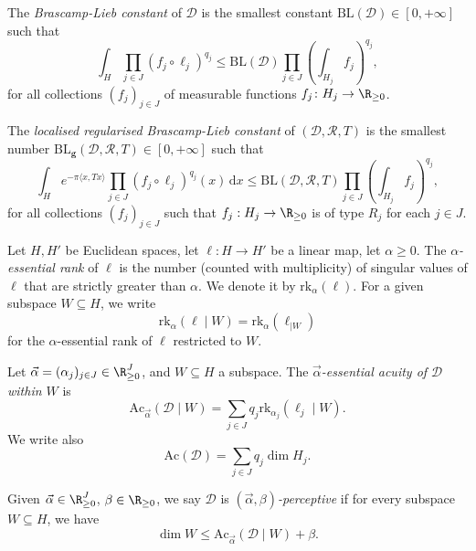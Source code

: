 The \emph{Brascamp-Lieb constant} of $\mathcal{D}$ is the smallest constant $\mathrm{BL}(\mathcal{D})\in [0, +\infty]$ such that
\begin{equation*}%
\int_{H} \prod_{j \in J} (f_{j}\circ \ell_{j})^{q_{j}} \leq \mathrm{BL}(\mathcal{D}) \prod_{j \in J} \left(\int_{H_{j}} f_{j} \right)^{q_{j}},
\end{equation*}
for all collections $(f_{j})_{j \in J}$ of measurable functions $f_j  \colon H_{j} \rightarrow \R_{\geq 0}$.

The \emph{localised regularised Brascamp-Lieb constant} of $(\mathcal{D}, \mathcal{R}, T)$ is the smallest number $\mathrm{BL}_{\mathbf{g}}(\mathcal{D}, \mathcal{R}, T)\in [0,+\infty]$ such that
\[
\int_{H} e^{-\pi \langle x, T x \rangle} \prod_{j \in J} (f_{j}\circ \ell_{j})^{q_{j}}(x) \,\mathrm{d} x \leq \mathrm{BL}(\mathcal{D}, \mathcal{R}, T) \prod_{j \in J} \left(\int_{H_{j}} f_{j} \right)^{q_{j}},
\]
for all collections $(f_{j})_{j \in J}$ such that $f_j :  H_{j}\rightarrow \R_{\geq 0}$ is of type $R_j$ for each $j \in J$.


\begin{definition}\label{def-ess-rank}
Let $H,H'$ be Euclidean spaces, let $\ell:H\rightarrow H'$ be a linear map, let $\alpha \geq 0$.
The  \emph{$\alpha$-essential rank} of $\ell$ is the number (counted with multiplicity) of  singular values of $\ell$ that are strictly greater than $\alpha$. We denote it by $\mathrm{rk}_\alpha(\ell)$.
For a given subspace $W \subseteq H$, we write
\[
\mathrm{rk}_\alpha(\ell \mid W) = \mathrm{rk}_\alpha( \ell_{\mid W})
\]
for the $\alpha$-essential rank of $\ell$ restricted to $W$.
\end{definition}

\begin{definition} \label{def-acuity}
Let $\vec{\alpha}=(\alpha_{j})_{j\in J} \in \R_{\geq 0}^J$, and $W\subseteq H$ a subspace. The \emph{$\vec{\alpha}$-essential acuity of $\mathcal{D}$ within $W$} is
$$\mathrm{Ac}_{\vec{\alpha}}(\mathcal{D} \mid W) = \sum_{j\in J} q_{j} \mathrm{rk}_{\alpha_{j}}(\ell_{j} \mid W).$$
We write also
$$\mathrm{Ac}(\mathcal{D})=\sum_{j\in J}q_{j}\dim H_{j}.$$
\end{definition}

\begin{definition}
Given $\vec{\alpha}\in \R_{\geq0}^J$, $\beta\in \R_{\geq0}$, we say $\mathcal{D}$ is \emph{$(\vec{\alpha}, \beta)$-perceptive}  if for every subspace $W\subseteq H$, we have
\begin{equation}\label{def-alpha-beta-percep}
\dim W \leq \mathrm{Ac}_{\vec{\alpha}}(\mathcal{D} \mid W) + \beta.
\end{equation}
\end{definition}

